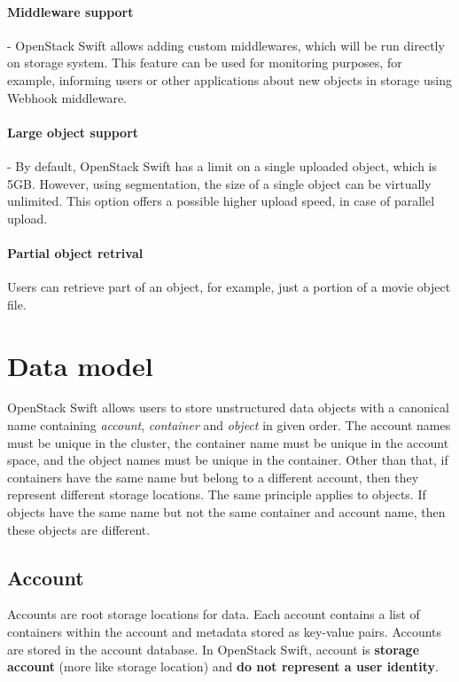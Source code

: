     \paragraph{Middleware support}
    - OpenStack Swift allows adding custom middlewares, which will be run directly on storage system\cite{swiftEssentials}. This feature can be used for monitoring purposes, for example, informing users or other applications about new objects in storage using Webhook middleware.

    \paragraph{Large object support}
    - By default, OpenStack Swift has a limit on a single uploaded object, which is 5GB. However, using segmentation, the size of a single object can be virtually unlimited. This option offers a possible higher upload speed, in case of parallel upload\cite{swiftLOS}.

    \paragraph{Partial object retrival}
    Users can retrieve part of an object, for example, just a portion of a movie object file\cite{swiftImplementingCloudStorage}.

    \section{Data model}
    OpenStack Swift allows users to store unstructured data objects with a canonical name containing \textit{account}, \textit{container} and \textit{object} in given order\cite{swiftOpenStackSwift}. The account names must be unique in the cluster, the container name must be unique in the account space, and the object names must be unique in the container. Other than that, if containers have the same name but belong to a different account, then they represent different storage locations. The same principle applies to objects. If objects have the same name but not the same container and account name, then these objects are different.

    \subsection{Account}
    Accounts are root storage locations for data. Each account contains a list of containers within the account and metadata stored as key-value pairs. Accounts are stored in the account database. In OpenStack Swift, account is \textbf{storage account} (more like storage location) and \textbf{do not represent a user identity}\cite{swiftOpenStackSwift}.

